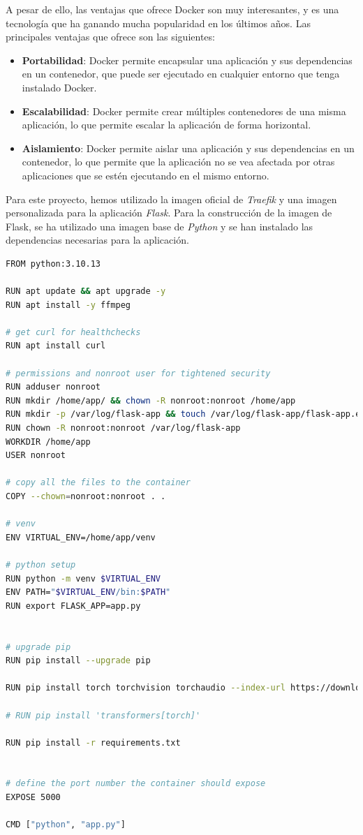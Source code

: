 A pesar de ello, las ventajas que ofrece Docker son muy interesantes, y es una tecnología que ha ganando mucha popularidad en los últimos años.
Las principales ventajas que ofrece son las siguientes:

\begin{itemize}
    \item \textbf{Portabilidad}: Docker permite encapsular una aplicación y sus dependencias en un contenedor, que puede ser ejecutado en cualquier entorno que tenga instalado Docker.
    \item \textbf{Escalabilidad}: Docker permite crear múltiples contenedores de una misma aplicación, lo que permite escalar la aplicación de forma horizontal.
    \item \textbf{Aislamiento}: Docker permite aislar una aplicación y sus dependencias en un contenedor, lo que permite que la aplicación no se vea afectada por otras aplicaciones que se estén ejecutando en el mismo entorno.
\end{itemize}

Para este proyecto, hemos utilizado la imagen oficial de \textit{Traefik} y una imagen personalizada para la aplicación \textit{Flask}.
Para la construcción de la imagen de Flask, se ha utilizado una imagen base de \textit{Python} y se han instalado las dependencias necesarias para la aplicación.

\begin{lstlisting}[language=bash, caption={Dockerfile para la aplicación \textit{Flask}}, label={lst:dockerfile}]
FROM python:3.10.13

RUN apt update && apt upgrade -y
RUN apt install -y ffmpeg

# get curl for healthchecks
RUN apt install curl

# permissions and nonroot user for tightened security
RUN adduser nonroot
RUN mkdir /home/app/ && chown -R nonroot:nonroot /home/app
RUN mkdir -p /var/log/flask-app && touch /var/log/flask-app/flask-app.err.log && touch /var/log/flask-app/flask-app.out.log
RUN chown -R nonroot:nonroot /var/log/flask-app
WORKDIR /home/app
USER nonroot

# copy all the files to the container
COPY --chown=nonroot:nonroot . .

# venv
ENV VIRTUAL_ENV=/home/app/venv

# python setup
RUN python -m venv $VIRTUAL_ENV
ENV PATH="$VIRTUAL_ENV/bin:$PATH"
RUN export FLASK_APP=app.py


# upgrade pip
RUN pip install --upgrade pip

RUN pip install torch torchvision torchaudio --index-url https://download.pytorch.org/whl/cpu

# RUN pip install 'transformers[torch]'

RUN pip install -r requirements.txt


# define the port number the container should expose
EXPOSE 5000

CMD ["python", "app.py"]

\end{lstlisting}

